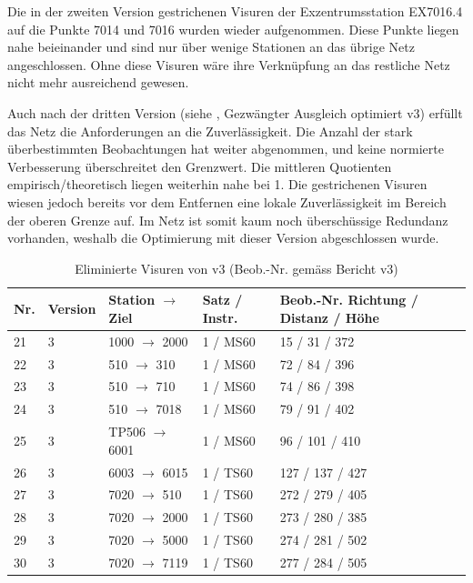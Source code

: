 Die in der zweiten Version gestrichenen Visuren der Exzentrumsstation EX7016.4 auf die Punkte 7014 und 7016 wurden
wieder aufgenommen. Diese Punkte liegen nahe beieinander und sind nur über wenige Stationen an das übrige Netz
angeschlossen. Ohne diese Visuren wäre ihre Verknüpfung an das restliche Netz nicht mehr ausreichend gewesen.\bigskip

Auch nach der dritten Version (siehe , Gezwängter Ausgleich optimiert v3) erfüllt das Netz die Anforderungen an die Zuverlässigkeit. 
Die Anzahl der stark überbestimmten Beobachtungen hat weiter abgenommen, und keine normierte Verbesserung überschreitet den Grenzwert.
Die mittleren Quotienten empirisch/theoretisch liegen weiterhin nahe bei 1. Die gestrichenen Visuren wiesen jedoch
bereits vor dem Entfernen eine lokale Zuverlässigkeit im Bereich der oberen Grenze auf. Im Netz ist somit kaum noch
überschüssige Redundanz vorhanden, weshalb die Optimierung mit dieser Version abgeschlossen wurde.
\bigskip
\begin{table}[H]
    \centering
    \begin{tabular}{p{0.8cm} p{1.2cm} p{3.2cm} p{2.5cm} p{5.3cm}}
        \toprule
        Nr. & Version & Station $\rightarrow$ Ziel & Satz / Instr. & Beob.-Nr. Richtung / Distanz / Höhe \\
        \midrule
        21 & 3 & 1000 $\rightarrow$ 2000  & 1 / MS60 & 15 / 31 / 372 \\
        22 & 3 & 510 $\rightarrow$ 310    & 1 / MS60 & 72 / 84 / 396 \\
        23 & 3 & 510 $\rightarrow$ 710    & 1 / MS60 & 74 / 86 / 398 \\
        24 & 3 & 510 $\rightarrow$ 7018   & 1 / MS60 & 79 / 91 / 402 \\
        25 & 3 & TP506 $\rightarrow$ 6001 & 1 / MS60 & 96 / 101 / 410 \\
        26 & 3 & 6003 $\rightarrow$ 6015  & 1 / TS60 & 127 / 137 / 427 \\
        27 & 3 & 7020 $\rightarrow$ 510   & 1 / TS60 & 272 / 279 / 405 \\
        28 & 3 & 7020 $\rightarrow$ 2000  & 1 / TS60 & 273 / 280 / 385 \\
        29 & 3 & 7020 $\rightarrow$ 5000  & 1 / TS60 & 274 / 281 / 502 \\
        30 & 3 & 7020 $\rightarrow$ 7119  & 1 / TS60 & 277 / 284 / 505 \\
        \bottomrule
    \end{tabular}
    \caption{Eliminierte Visuren von v3 (Beob.-Nr. gemäss Bericht v3)}
    \label{tab:eliminierte_visuren_v3}
\end{table}
\label{sec:v0}
\bigskip


